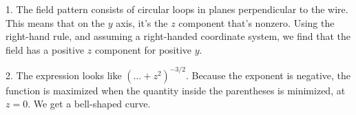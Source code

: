 1. The field pattern consists of circular loops in planes perpendicular
to the wire. This means that on the $y$ axis, it's the $z$ component that's
nonzero. Using the right-hand rule, and assuming a right-handed coordinate
system, we find that the field has a positive $z$ component for positive $y$.

2. The expression looks like $(\ldots+z^2)^{-3/2}$. Because the exponent is
negative, the function is maximized when 
the quantity inside
the parentheses is minimized, at $z=0$. We get a bell-shaped curve.


